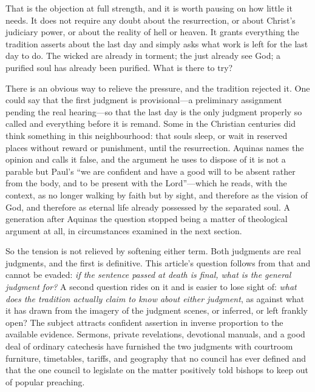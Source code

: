 That is the objection at full strength, and it is worth pausing on how little it needs. It does not require any doubt about the resurrection, or about Christ's judiciary power, or about the reality of hell or heaven. It grants everything the tradition asserts about the last day and simply asks what work is left for the last day to do. The wicked are already in torment; the just already see God; a purified soul has already been purified. What is there to try?

There is an obvious way to relieve the pressure, and the tradition rejected it. One could say that the first judgment is provisional---a preliminary assignment pending the real hearing---so that the last day is the only judgment properly so called and everything before it is remand. Some in the Christian centuries did think something in this neighbourhood: that souls sleep, or wait in reserved places without reward or punishment, until the resurrection. Aquinas names the opinion and calls it false, and the argument he uses to dispose of it is not a parable but Paul's ``we are confident and have a good will to be absent rather from the body, and to be present with the Lord''---which he reads, with the context, as no longer walking by faith but by sight, and therefore as the vision of God, and therefore as eternal life already possessed by the separated soul. A generation after Aquinas the question stopped being a matter of theological argument at all, in circumstances examined in the next section.

So the tension is not relieved by softening either term. Both judgments are real judgments, and the first is definitive. This article's question follows from that and cannot be evaded: \emph{if the sentence passed at death is final, what is the general judgment for?} A second question rides on it and is easier to lose sight of: \emph{what does the tradition actually claim to know about either judgment}, as against what it has drawn from the imagery of the judgment scenes, or inferred, or left frankly open? The subject attracts confident assertion in inverse proportion to the available evidence. Sermons, private revelations, devotional manuals, and a good deal of ordinary catechesis have furnished the two judgments with courtroom furniture, timetables, tariffs, and geography that no council has ever defined and that the one council to legislate on the matter positively told bishops to keep out of popular preaching.


